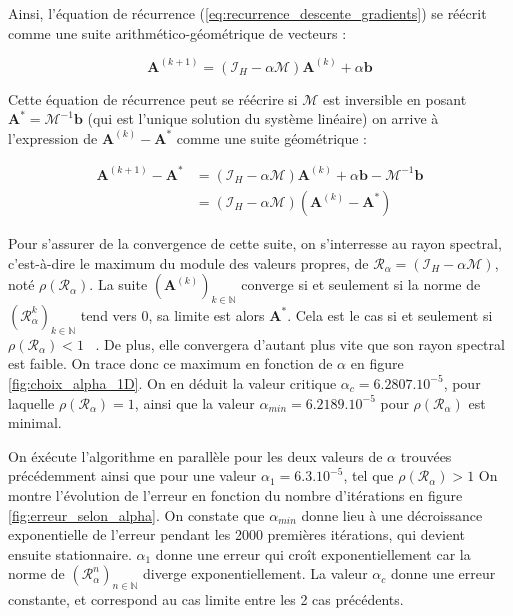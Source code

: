 \documentclass[12pt]{report}
\begin{document}
Ainsi, l'équation de récurrence (\ref{eq:recurrence_descente_gradients}) se réécrit comme une suite arithmético-géométrique de vecteurs :

\begin{equation}
    \bm{A}^{(k+1)} = (\mathcal{I}_H - \alpha \mathcal{M} )  \bm{A}^{(k)} + \alpha\bm{b}
    \label{eq:recurrence_descente_gradients_v2}
\end{equation}

Cette équation de récurrence peut se réécrire si $\mathcal M$ est inversible en posant $\bm{A^*} = \mathcal {M}^{-1}\bm{b}$ (qui est l'unique solution du système linéaire) on arrive à l'expression de $\bm{A}^{(k)}-\bm{A^*} $ comme une suite géométrique :

\begin{equation}
    \begin{aligned}
        \bm{A}^{(k+1)}-\bm{A^*} & = (\mathcal{I}_H - \alpha \mathcal{M} )  \bm{A}^{(k)} + \alpha\bm{b} - \mathcal {M}^{-1}\bm{b} \\
                                & = (\mathcal{I}_H - \alpha \mathcal{M} ) (\bm{A}^{(k)}-\bm{A^*} )
    \end{aligned}
    \label{eq:recurrence_descente_gradients_2D_v2}
\end{equation}

Pour s'assurer de la convergence de cette suite, on s'interresse au rayon spectral, c'est-à-dire le maximum du module des valeurs propres, de $\mathcal{R}_\alpha = (\mathcal{I}_H - \alpha \mathcal{M} )$, noté $\rho(\mathcal{R}_\alpha)$.
La suite $(\bm{A}^{(k)})_{k\in \mathbb{N}}$ converge si et seulement si la norme de $(\mathcal{R}_\alpha ^k)_{k\in \mathbb{N}}$ tend vers 0, sa limite est alors $\bm A^*$.
Cela est le cas si et seulement si $\rho(\mathcal{R}_\alpha)<1$ ~\cite{WikiRayonSpectral}.
De plus, elle convergera d'autant plus vite que son rayon spectral est faible.
On trace donc ce maximum en fonction de $\alpha$ en figure \ref{fig:choix_alpha_1D}.
On en déduit la valeur critique $\alpha_c = 6.2807.10^{-5}$, pour laquelle $\rho(\mathcal{R}_\alpha)=1$, ainsi que la valeur $\alpha_{min} = 6.2189.10^{-5}$ pour $\rho(\mathcal{R}_\alpha)$ est minimal.

On éxécute l'algorithme en parallèle pour les deux valeurs de $\alpha$ trouvées précédemment ainsi que pour une valeur $\alpha_1 = 6.3.10^{-5}$, tel que $\rho(\mathcal{R}_\alpha)>1$
On montre l'évolution de l'erreur en fonction du nombre d'itérations en figure \ref{fig:erreur_selon_alpha}.
On constate que $\alpha_{min}$ donne lieu à une décroissance exponentielle de l'erreur pendant les 2000 premières itérations, qui devient ensuite stationnaire.
$\alpha_1$ donne une erreur qui croît exponentiellement car la norme de $(\mathcal{R}_\alpha ^n)_{n\in \mathbb{N}}$ diverge exponentiellement.
La valeur $\alpha_c$ donne une erreur constante, et correspond au cas limite entre les 2 cas précédents.
\end{document}
